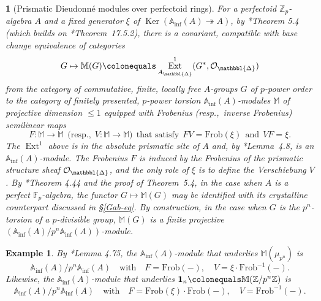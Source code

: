 \documentclass[11pt, reqno]{amsart}
\newcommand{\bA}{\mathbb{A}}
\newcommand{\bF}{\mathbb{F}}
\newcommand{\bM}{\mathbb{M}}
\newcommand{\bZ}{\mathbb{Z}}
\newcommand{\cO}{\mathcal{O}}
\DeclareMathOperator{\Ext}{Ext}		%
\DeclareMathOperator{\Ker}{Ker}		%
\newcommand{\ce}{\colonequals}
\newcommand{\Frob}{\mathrm{Frob}}			%
\renewcommand{\i}{^{-1}}
\newcommand{\Inf}{\mathrm{inf}}		%
\newcommand{\Prism}{{ \mathbbl{\Delta}}}
\newcommand{\ra}{\rightarrow}
\newcommand{\surjects}{\twoheadrightarrow}
\newcommand{\beg}{\begin{eg}}
\newcommand{\eeg}{\end{eg}}
\newcommand{\x}{\text}
\providecommand{\qxq}[1]{\quad\text{#1}\quad}
\newcommand{\q}{\quad}
\numberwithin{equation}{numberingbase}
\theoremstyle{thms}
\theoremstyle{claims}
\theoremstyle{defs}
\newtheorem{eg}[numberingbase]{Example}
\theoremstyle{thms}
\theoremstyle{defs}
\theoremstyle{subsection-tweak}
\newtheorem{pp}[numberingbase]{}
\newcommand{\bpp}{\begin{pp}}
\newcommand{\epp}{\end{pp}}
\theoremstyle{subsection-tweak}
\begin{document}
\bpp[Prismatic Dieudonn\'{e} modules over perfectoid rings] \label{pp:prismatic-review}\label{thm:dieudonne}
For a perfectoid $\bZ_p$-algebra $A$ and a fixed generator $\xi$ of $\Ker(\bA_\Inf(A) \surjects A)$, by \cite{ALB20}*{Theorem 5.4} (which builds on \cite{SW19}*{Theorem~17.5.2}), there is a covariant, compatible with base change %
equivalence of categories
\[
G \mapsto \bM(G) \ce \Ext^1_{A_\Prism}(G^*, \mathcal O_\Prism)
\]
from the category of commutative, finite, locally free $A$-groups $G$ of $p$-power order to the category of finitely presented, $p$-power torsion $\bA_\Inf(A)$-modules $\bM$ of projective dimension $\le 1$ equipped with Frobenius (resp.,~inverse Frobenius) semilinear maps 
\[
F \colon \bM \ra \bM \ \ \x{(resp.,}\ \ V \colon \bM \ra \bM) \ \ \x{that satisfy} \ \ FV = \Frob(\xi) \ \ \x{and}\ \ VF = \xi.
\]
The $\Ext^1$ above is in the absolute prismatic site of $A$ %
and, by \cite{BS19}*{Lemma~4.8}, is an $\bA_\Inf(A)$-module. The Frobenius $F$ is induced by the Frobenius of the prismatic structure sheaf $\cO_{\Prism}$, and the only role of $\xi$ is to define the Verschiebung $V$. By \cite{ALB20}*{Theorem 4.44 and the proof of Theorem~5.4}, in the case when $A$ is a perfect $\bF_p$-algebra, %
the functor $G \mapsto \bM(G)$ may be identified with its crystalline counterpart discussed in \S\ref{Gab-eq}. %
By construction, in the case when $G$ is the $p^n$-torsion of a $p$-divisible group, $\bM(G)$ is a finite projective $(\bA_\Inf(A)/p^n\bA_\Inf(A))$-module.
\epp


\beg \label{explicit-M(G)}
By \cite{ALB20}*{Lemma 4.75}, the $\bA_\Inf(A)$-module that underlies $\bM(\mu_{p^n})$ is %
\[
\bA_\Inf(A)/p^n\bA_\Inf(A) \qxq{with} F = \Frob(-),\q V = \xi\cdot\Frob\i(-).
\]
Likewise, %
the $\bA_\Inf(A)$-module that underlies ${\mathbf{1}}_n \ce \bM(\bZ/p^n\bZ)$ is  
\[
\bA_\Inf(A)/p^n\bA_\Inf(A) \qxq{with} F = \Frob(\xi)\cdot\Frob(-), \q V = \Frob\i(-).
\] 
\eeg
\end{document}
